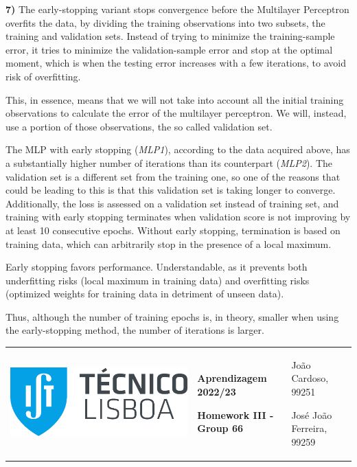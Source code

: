 \documentclass[11pt,a4paper]{article}
\begin{document}
\begin{flushleft}
  \vspace{-2mm}
  \textbf{7)}
  The early-stopping variant stops convergence before the Multilayer Perceptron overfits the data, by dividing the training observations into two subsets, the training and validation sets. Instead of trying to minimize the training-sample error, it tries to minimize the validation-sample error and stop at the optimal moment, which is when the testing error increases with a few iterations, to avoid risk of overfitting.

  This, in essence, means that we will not take into account all the initial training observations to calculate the error of the multilayer perceptron. We will, instead, use a portion of those observations, the so called validation set.

  The MLP with early stopping (\textit{MLP1}), according to the data acquired above, has a substantially higher number of iterations than its counterpart (\textit{MLP2}).
  The validation set is a different set from the training one, so one of the reasons that could be leading to this is that this validation set is taking longer to converge. Additionally, the loss is assessed on a validation set instead of training set, and training with early stopping terminates when validation score is not improving by at least 10 consecutive epochs. Without early stopping, termination is based on training data, which can arbitrarily stop in the presence of a local maximum.

  Early stopping favors performance. Understandable, as it prevents both underfitting risks (local maximum in training data) and overfitting risks (optimized weights for training data in detriment of unseen data).

  Thus, although the number of training epochs is, in theory, smaller when using the early-stopping method, the number of iterations is larger.
\end{flushleft}

\pagebreak
\hspace{-8.25mm}
\color{darkgray}
\renewcommand\tabularxcolumn[1]{m{#1}}
\begin{tabularx}{1.09\textwidth} {>{\raggedright\arraybackslash}X >{\centering\arraybackslash}X >{\raggedleft\arraybackslash}X}
  \includegraphics[scale=0.2]{tecnico.pdf}                            &
  \textbf{Aprendizagem 2022/23} \par \textbf{Homework III - Group 66} &
  João Cardoso, 99251 \par José João Ferreira, 99259
\end{tabularx}
\renewcommand\tabularxcolumn[1]{p{#1}}
\color{black}
\end{document}
